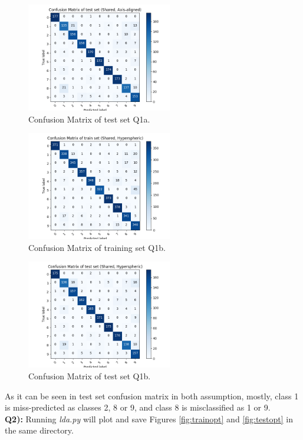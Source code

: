 \documentclass[12pt]{article}
\begin{document}
\begin{figure}[ht]
	\centerline{\includegraphics[width=2.5in]{testdiag.png}}
	\caption{Confusion Matrix of test set Q1a.}
	\label{fig:testdiag}
\end{figure}
\begin{figure}[ht]
	\centerline{\includegraphics[width=2.5in]{traineq.png}}
	\caption{Confusion Matrix of training set Q1b.}
	\label{fig:traineq}
\end{figure}
\begin{figure}[ht]
	\centerline{\includegraphics[width=2.5in]{testeq.png}}
	\caption{Confusion Matrix of test set Q1b.}
	\label{fig:testeq}
\end{figure}
As it can be seen in test set confusion matrix in both assumption, mostly, class 1 is miss-predicted as classes 2, 8 or 9, and class 8 is misclassified as 1 or 9.\\
\newpage
\newpage
\textbf{Q2):} Running \textit{lda.py} will plot and save Figures \ref{fig:trainopt} and \ref{fig:testopt} in the same directory.
\end{document}
